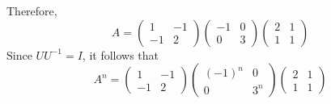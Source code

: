 \documentclass[11pt]{scrartcl}
\begin{document}
\begin{linenumbers}
\begin{soln}
    Therefore,
    \begin{equation*}
      A =     \begin{pmatrix}
        1  & -1 \\
        -1 & 2
      \end{pmatrix}
      \begin{pmatrix}
        -1 & 0\\
        0 & 3
      \end{pmatrix}
      \begin{pmatrix}
        2 & 1\\
        1 & 1
      \end{pmatrix}
    \end{equation*}
    Since $UU^{-1}=I$, it follows that
    \begin{equation*}
      A^{n} =     \begin{pmatrix}
        1  & -1 \\
        -1 & 2
      \end{pmatrix}
      \begin{pmatrix}
        (-1)^{n} & 0\\
        0 & 3^{n}
      \end{pmatrix}
      \begin{pmatrix}
        2 & 1\\
        1 & 1
      \end{pmatrix}
    \end{equation*}






  \end{soln}



\end{linenumbers}
\end{document}
